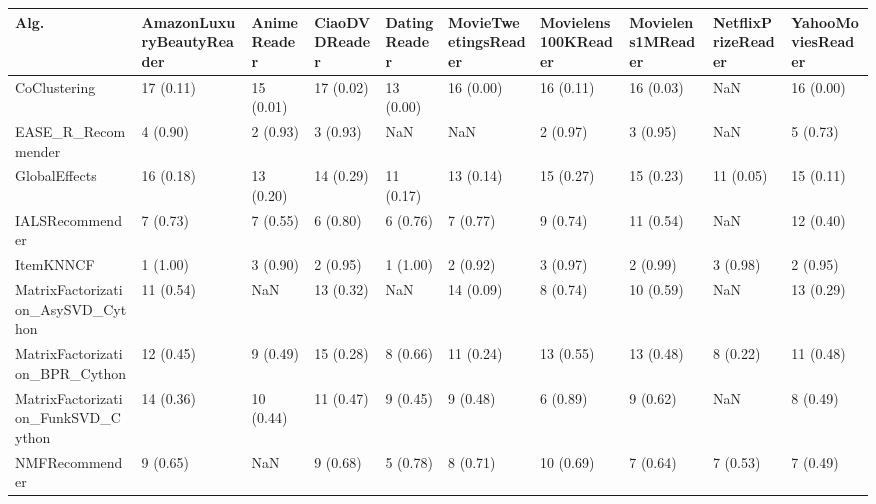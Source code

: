\begin{tabular}{llllllllll}
\toprule
                               Alg. & AmazonLuxuryBeautyReader & AnimeReader & CiaoDVDReader & DatingReader & MovieTweetingsReader & Movielens100KReader & Movielens1MReader & NetflixPrizeReader & YahooMoviesReader \\
\midrule
                       CoClustering &                17 (0.11) &   15 (0.01) &     17 (0.02) &    13 (0.00) &            16 (0.00) &           16 (0.11) &         16 (0.03) &                NaN &         16 (0.00) \\
                 EASE\_R\_Recommender &                 4 (0.90) &    2 (0.93) &      3 (0.93) &          NaN &                  NaN &            2 (0.97) &          3 (0.95) &                NaN &          5 (0.73) \\
                      GlobalEffects &                16 (0.18) &   13 (0.20) &     14 (0.29) &    11 (0.17) &            13 (0.14) &           15 (0.27) &         15 (0.23) &          11 (0.05) &         15 (0.11) \\
                    IALSRecommender &                 7 (0.73) &    7 (0.55) &      6 (0.80) &     6 (0.76) &             7 (0.77) &            9 (0.74) &         11 (0.54) &                NaN &         12 (0.40) \\
                          ItemKNNCF &                 1 (1.00) &    3 (0.90) &      2 (0.95) &     1 (1.00) &             2 (0.92) &            3 (0.97) &          2 (0.99) &           3 (0.98) &          2 (0.95) \\
  MatrixFactorization\_AsySVD\_Cython &                11 (0.54) &         NaN &     13 (0.32) &          NaN &            14 (0.09) &            8 (0.74) &         10 (0.59) &                NaN &         13 (0.29) \\
     MatrixFactorization\_BPR\_Cython &                12 (0.45) &    9 (0.49) &     15 (0.28) &     8 (0.66) &            11 (0.24) &           13 (0.55) &         13 (0.48) &           8 (0.22) &         11 (0.48) \\
 MatrixFactorization\_FunkSVD\_Cython &                14 (0.36) &   10 (0.44) &     11 (0.47) &     9 (0.45) &             9 (0.48) &            6 (0.89) &          9 (0.62) &                NaN &          8 (0.49) \\
                     NMFRecommender &                 9 (0.65) &         NaN &      9 (0.68) &     5 (0.78) &             8 (0.71) &           10 (0.69) &          7 (0.64) &           7 (0.53) &          7 (0.49) \\

\end{tabular}
